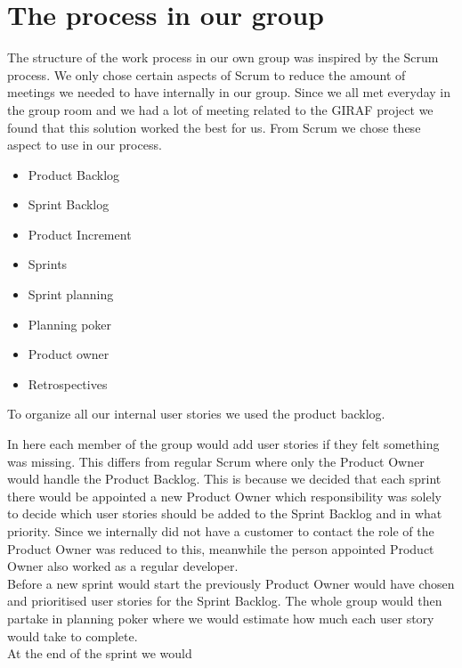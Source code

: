 \section{The process in our group}

The structure of the work process in our own group was inspired by the Scrum process.
We only chose certain aspects of Scrum to reduce the amount of meetings we needed to have internally in our group. 
Since we all met everyday in the group room and we had a lot of meeting related to the GIRAF project we found that this solution worked the best for us.
From Scrum we chose these aspect to use in our process.

 \begin{itemize}
    \item Product Backlog
    \item Sprint Backlog
    \item Product Increment
    \item Sprints
    \item Sprint planning
    \item Planning poker
    \item Product owner
    \item Retrospectives
 \end{itemize}

 To organize all our internal user stories we used the product backlog.
 
 In here each member of the group would add user stories if they felt something was missing.
 This differs from regular Scrum where only the Product Owner would handle the Product Backlog.
 This is because we decided that each sprint there would be appointed a new Product Owner which responsibility was solely to decide which user stories should be added to the Sprint Backlog and in what priority.
 Since we internally did not have a customer to contact the role of the Product Owner was reduced to this, meanwhile the person appointed Product Owner also worked as a regular developer.
 \\
 Before a new sprint would start the previously Product Owner would have chosen and prioritised user stories for the Sprint Backlog.
 The whole group would then partake in planning poker where we would estimate how much each user story would take to complete.
 \\
 At the end of the sprint we would 

